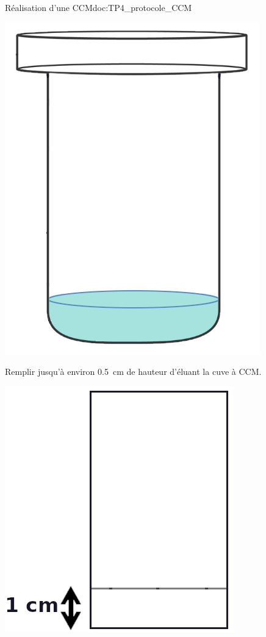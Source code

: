\begin{doc}{Réalisation d'une CCM}{doc:TP4_protocole_CCM}
  \begin{multicols}{3}
    \begin{center}
      \includegraphics[height=0.15\textheight]{images/chimie/CCM/CCM_etapes_cuve.png}
      
      Remplir jusqu'à environ \qty{0,5}{\cm} de hauteur d'éluant la cuve à CCM.
    \end{center} 
    
    \begin{center}
      \includegraphics[height=0.15\textheight]{images/chimie/CCM/CCM_etapes_trait.png}
      

\end{center}
\end{multicols}
\end{doc}

